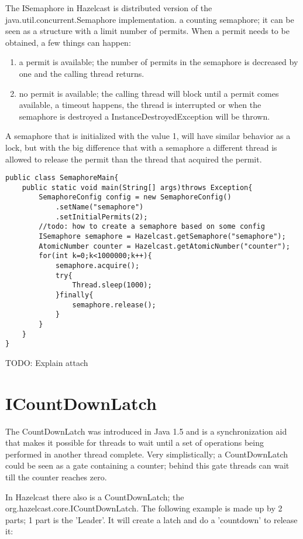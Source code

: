 The ISemaphore in Hazelcast is distributed version of the java.util.concurrent.Semaphore
implementation. a counting semaphore; it can be seen as a structure with 
a limit number of permits. When a permit needs to be obtained, a few things can happen:
\begin{enumerate}
\item a permit is available; the number of permits in the semaphore is decreased by one 
and the calling thread returns.
\item no permit is available; the calling thread will block until a permit comes available,
a timeout happens, the thread is interrupted or when the semaphore is destroyed a InstanceDestroyedException
will be thrown.
\end{enumerate}

A semaphore that is initialized with the value 1, will have similar behavior as a lock,
but with the big difference that with a semaphore a different thread is allowed to release
the permit than the thread that acquired the permit.

\begin{verbatim}
public class SemaphoreMain{
    public static void main(String[] args)throws Exception{
        SemaphoreConfig config = new SemaphoreConfig()
            .setName("semaphore")
            .setInitialPermits(2);
        //todo: how to create a semaphore based on some config
        ISemaphore semaphore = Hazelcast.getSemaphore("semaphore");
        AtomicNumber counter = Hazelcast.getAtomicNumber("counter");
        for(int k=0;k<1000000;k++){
            semaphore.acquire();
            try{
                Thread.sleep(1000);
            }finally{
                semaphore.release();
            }
        }
    }
}
\end{verbatim}

TODO: Explain attach

\section{ICountDownLatch}
The CountDownLatch was introduced in Java 1.5 and is a synchronization aid that makes it
possible for threads to wait until a set of operations being performed in another thread 
complete. Very simplistically; a CountDownLatch could be seen as a gate containing a counter;
behind this gate threads can wait till the counter reaches zero. 

In Hazelcast there also is a CountDownLatch; the org.hazelcast.core.ICountDownLatch. 
The following example is made up by 2 parts; 1 part is the 'Leader'. It will create a latch
and do a 'countdown' to release it:

